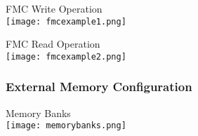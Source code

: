 \begin{example2}{FMC Write Operation}\\
\texttt{[image: fmcexample1.png]}
\end{example2}

\begin{example2}{FMC Read Operation}\\
\texttt{[image: fmcexample2.png]}
\end{example2}

\subsubsection{External Memory Configuration}

\begin{concept}{Memory Banks}\\
    \texttt{[image: memorybanks.png]}\\
\end{concept}

